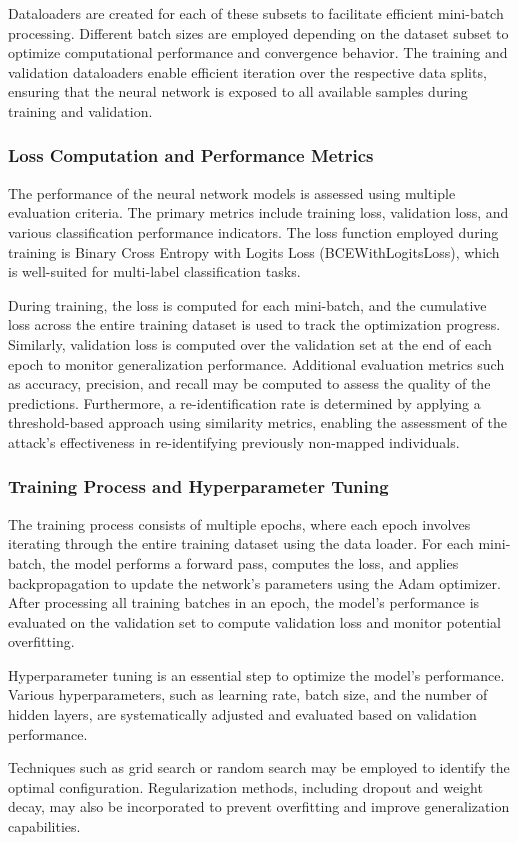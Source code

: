 Dataloaders are created for each of these subsets to facilitate efficient mini-batch processing.
Different batch sizes are employed depending on the dataset subset to optimize computational performance and convergence behavior.
The training and validation dataloaders enable efficient iteration over the respective data splits, ensuring that the neural network is exposed to all available samples during training and validation.

\subsubsection{Loss Computation and Performance Metrics}

The performance of the neural network models is assessed using multiple evaluation criteria.
The primary metrics include training loss, validation loss, and various classification performance indicators.
The loss function employed during training is Binary Cross Entropy with Logits Loss (BCEWithLogitsLoss), which is well-suited for multi-label classification tasks.

During training, the loss is computed for each mini-batch, and the cumulative loss across the entire training dataset is used to track the optimization progress.
Similarly, validation loss is computed over the validation set at the end of each epoch to monitor generalization performance.
Additional evaluation metrics such as accuracy, precision, and recall may be computed to assess the quality of the predictions.
Furthermore, a re-identification rate is determined by applying a threshold-based approach using similarity metrics, enabling the assessment of the attack’s effectiveness in re-identifying previously non-mapped individuals.

\subsubsection{Training Process and Hyperparameter Tuning}

The training process consists of multiple epochs, where each epoch involves iterating through the entire training dataset using the data loader.
For each mini-batch, the model performs a forward pass, computes the loss, and applies backpropagation to update the network’s parameters using the Adam optimizer.
After processing all training batches in an epoch, the model’s performance is evaluated on the validation set to compute validation loss and monitor potential overfitting.

Hyperparameter tuning is an essential step to optimize the model’s performance.
Various hyperparameters, such as learning rate, batch size, and the number of hidden layers, are systematically adjusted and evaluated based on validation performance.

Techniques such as grid search or random search may be employed to identify the optimal configuration. Regularization methods, including dropout and weight decay, may also be incorporated to prevent overfitting and improve generalization capabilities.




